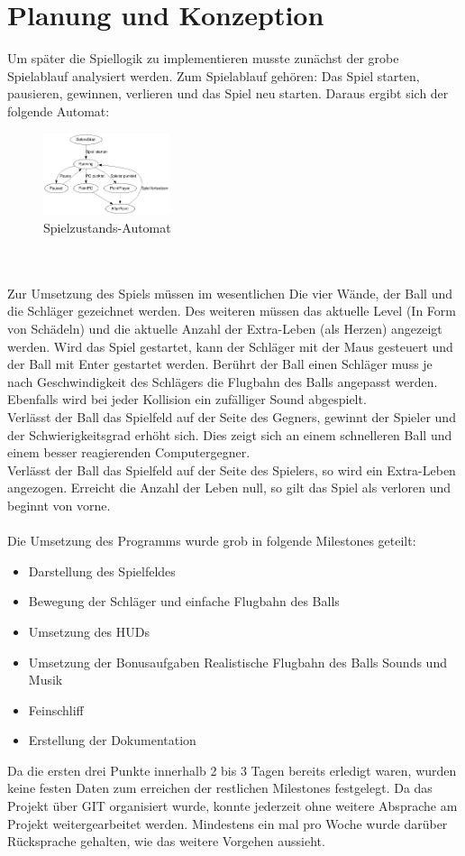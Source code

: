 
\section{Planung und Konzeption}
Um später die Spiellogik zu implementieren musste zunächst der grobe Spielablauf analysiert werden. Zum Spielablauf gehören: Das Spiel starten, pausieren, gewinnen, verlieren und das Spiel neu starten. Daraus ergibt sich der folgende Automat:\\
\begin{figure}[ht]
	\centering
\includegraphics[width=0.33\textwidth]{fsm.png}
\caption{Spielzustands-Automat}
\end{figure}\\\\
Zur Umsetzung des Spiels müssen im wesentlichen Die vier Wände, der Ball und die Schläger gezeichnet werden. Des weiteren müssen das aktuelle Level (In Form von Schädeln) und die aktuelle Anzahl der Extra-Leben (als Herzen) angezeigt werden. Wird das Spiel gestartet, kann der Schläger mit der Maus gesteuert und der Ball mit Enter gestartet werden. Berührt der Ball einen Schläger muss je nach Geschwindigkeit des Schlägers die Flugbahn des Balls angepasst werden. Ebenfalls wird bei jeder Kollision ein zufälliger Sound abgespielt. \\
Verlässt der Ball das Spielfeld auf der Seite des Gegners, gewinnt der Spieler und der Schwierigkeitsgrad erhöht sich. Dies zeigt sich an einem schnelleren Ball und einem besser reagierenden Computergegner.\\
Verlässt der Ball das Spielfeld auf der Seite des Spielers, so wird ein Extra-Leben angezogen. Erreicht die Anzahl der Leben null, so gilt das Spiel als verloren und beginnt von vorne.\\\\
Die Umsetzung des Programms wurde grob in folgende Milestones geteilt:\\
\begin{itemize}
	\item Darstellung des Spielfeldes
	\item Bewegung der Schläger und einfache Flugbahn des Balls
	\item Umsetzung des HUDs
	\item Umsetzung der Bonusaufgaben
	\subitem Realistische Flugbahn des Balls
	\subitem Sounds und Musik
	\item Feinschliff
	\item Erstellung der Dokumentation
\end{itemize}
Da die ersten drei Punkte innerhalb 2 bis 3 Tagen bereits erledigt waren, wurden keine festen Daten zum erreichen der restlichen Milestones festgelegt. Da das Projekt über GIT organisiert wurde, konnte jederzeit ohne weitere Absprache am Projekt weitergearbeitet werden. Mindestens ein mal pro Woche wurde darüber Rücksprache gehalten, wie das weitere Vorgehen aussieht.